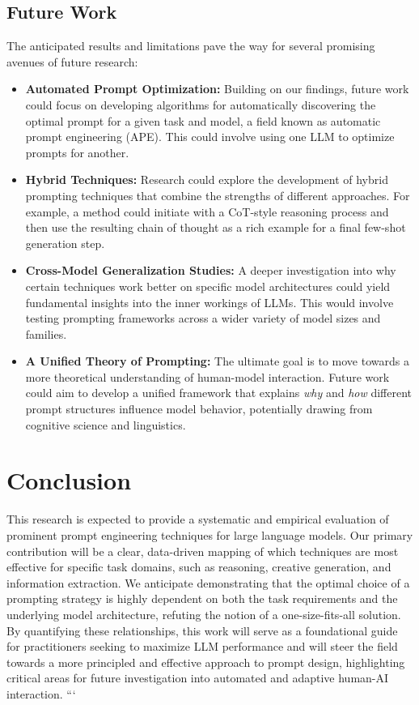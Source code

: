 \documentclass{article}
\begin{document}
\subsection{Future Work}
The anticipated results and limitations pave the way for several promising avenues of future research:
\begin{itemize}
    \item \textbf{Automated Prompt Optimization:} Building on our findings, future work could focus on developing algorithms for automatically discovering the optimal prompt for a given task and model, a field known as automatic prompt engineering (APE). This could involve using one LLM to optimize prompts for another.
    \item \textbf{Hybrid Techniques:} Research could explore the development of hybrid prompting techniques that combine the strengths of different approaches. For example, a method could initiate with a CoT-style reasoning process and then use the resulting chain of thought as a rich example for a final few-shot generation step.
    \item \textbf{Cross-Model Generalization Studies:} A deeper investigation into why certain techniques work better on specific model architectures could yield fundamental insights into the inner workings of LLMs. This would involve testing prompting frameworks across a wider variety of model sizes and families.
    \item \textbf{A Unified Theory of Prompting:} The ultimate goal is to move towards a more theoretical understanding of human-model interaction. Future work could aim to develop a unified framework that explains \textit{why} and \textit{how} different prompt structures influence model behavior, potentially drawing from cognitive science and linguistics.
\end{itemize}

\section{Conclusion}

This research is expected to provide a systematic and empirical evaluation of prominent prompt engineering techniques for large language models. Our primary contribution will be a clear, data-driven mapping of which techniques are most effective for specific task domains, such as reasoning, creative generation, and information extraction. We anticipate demonstrating that the optimal choice of a prompting strategy is highly dependent on both the task requirements and the underlying model architecture, refuting the notion of a one-size-fits-all solution. By quantifying these relationships, this work will serve as a foundational guide for practitioners seeking to maximize LLM performance and will steer the field towards a more principled and effective approach to prompt design, highlighting critical areas for future investigation into automated and adaptive human-AI interaction.
```
\end{document}
